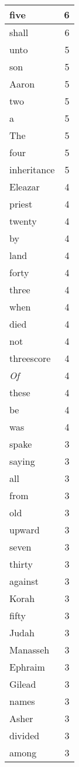 \begin{center}
\begin{longtable}{l|r}
five & 6\\ \hline 
shall & 6\\ \hline 
unto & 5\\ \hline 
son & 5\\ \hline 
Aaron & 5\\ \hline 
two & 5\\ \hline 
a & 5\\ \hline 
The & 5\\ \hline 
four & 5\\ \hline 
inheritance & 5\\ \hline 
Eleazar & 4\\ \hline 
priest & 4\\ \hline 
twenty & 4\\ \hline 
by & 4\\ \hline 
land & 4\\ \hline 
forty & 4\\ \hline 
three & 4\\ \hline 
when & 4\\ \hline 
died & 4\\ \hline 
not & 4\\ \hline 
threescore & 4\\ \hline 
\emph{Of} & 4\\ \hline 
these & 4\\ \hline 
be & 4\\ \hline 
was & 4\\ \hline 
spake & 3\\ \hline 
saying & 3\\ \hline 
all & 3\\ \hline 
from & 3\\ \hline 
old & 3\\ \hline 
upward & 3\\ \hline 
seven & 3\\ \hline 
thirty & 3\\ \hline 
against & 3\\ \hline 
Korah & 3\\ \hline 
fifty & 3\\ \hline 
Judah & 3\\ \hline 
Manasseh & 3\\ \hline 
Ephraim & 3\\ \hline 
Gilead & 3\\ \hline 
names & 3\\ \hline 
Asher & 3\\ \hline 
divided & 3\\ \hline 
among & 3\\ \hline 

\end{longtable}
\end{center}
